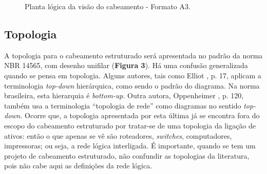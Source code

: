 \documentclass[	DIV=calc,%
							paper=a4,%
							fontsize=12pt,%
							onecolumn]{scrartcl}	 					%
\begin{document}
\recalctypearea

\begin{figure}
	\noindent{}
	\caption{Planta lógica da visão do cabeamento - Formato A3.}
	\label{fig2}
\end{figure}

\clearpage
{}
\recalctypearea











\subsection{Topologia}

A topologia para o cabeamento estruturado será apresentada no padrão da norma NBR 14565, com desenho unifilar (\textbf{Figura 3}). Há uma confusão generalizada quando se pensa em topologia. Alguns autores, tais como Elliot \cite{elliott}, p. 17, aplicam a terminologia \textit{top-down} hierárquica, como sendo o padrão do diagrama. Na norma brasileira, esta hierarquia é \textit{bottom-up}. Outra autora, Oppenheimer \cite{oppenheimer2004top}, p. 120, também usa a terminologia ``topologia de rede'' como diagramas no sentido \textit{top-down}. Ocorre que, a topologia apresentada por esta última já se encontra fora do escopo do cabeamento estruturado por tratar-se de uma topologia da ligação de ativos: então o que apenas se vê são roteadores, \textit{switches}, computadores, impressoras; ou seja, a rede lógica interligada. É importante, quando se tem um projeto de cabeamento estruturado, não confundir as topologias da literatura, pois não cabe aqui as definições da rede lógica.
\end{document}
